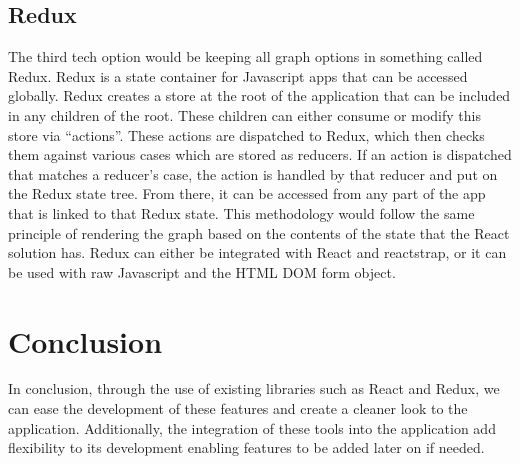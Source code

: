 \documentclass[letterpaper,10pt,titlepage, onecolumn]{IEEEtran}
\begin{document}
\subsection{Redux}
The third tech option would be keeping all graph options in something called Redux. Redux is a state container for Javascript apps that can be accessed globally. Redux creates a store at the root of the application that can be included in any children of the root. These children can either consume or modify this store via “actions”. These actions are dispatched to Redux, which then checks them against various cases which are stored as reducers. If an action is dispatched that matches a reducer’s case, the action is handled by that reducer and put on the Redux state tree. From there, it can be accessed from any part of the app that is linked to that Redux state. This methodology would follow the same principle of rendering the graph based on the contents of the state that the React solution has. Redux can either be integrated with React and reactstrap, or it can be used with raw Javascript and the HTML DOM form object.

\section{Conclusion}
In conclusion, through the use of existing libraries such as React and Redux, we can ease the development of these features and create a cleaner look to the application. Additionally, the integration of these tools into the application add flexibility to its development enabling features to be added later on if needed.
\end{document}
